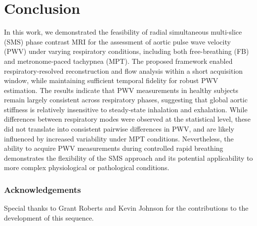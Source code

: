 \section{Conclusion}\label{sec:sms_conclusion}
In this work, we demonstrated the feasibility of radial simultaneous multi-slice (SMS) phase contrast MRI for the assessment of aortic pulse wave velocity (PWV) under varying respiratory conditions, including both free-breathing (FB) and metronome-paced tachypnea (MPT). The proposed framework enabled respiratory-resolved reconstruction and flow analysis within a short acquisition window, while maintaining sufficient temporal fidelity for robust PWV estimation. The results indicate that PWV measurements in healthy subjects remain largely consistent across respiratory phases, suggesting that global aortic stiffness is relatively insensitive to steady-state inhalation and exhalation. While differences between respiratory modes were observed at the statistical level, these did not translate into consistent pairwise differences in PWV, and are likely influenced by increased variability under MPT conditions. Nevertheless, the ability to acquire PWV measurements during controlled rapid breathing demonstrates the flexibility of the SMS approach and its potential applicability to more complex physiological or pathological conditions.

\subsubsection{Acknowledgements}
Special thanks to Grant Roberts and Kevin Johnson for the contributions to the development of this sequence.